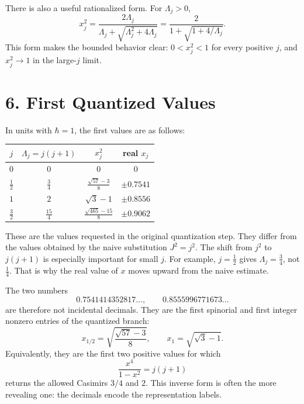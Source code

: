 \documentclass[11pt]{article}
\newcommand{\Lspin}{\Lambda_j}
\newcommand{\hb}{\hbar}
\begin{document}
There is also a useful rationalized form. For \(\Lspin>0\),
\begin{equation}
        x_j^2=
        \frac{2\Lspin}{\Lspin+\sqrt{\Lspin^2+4\Lspin}}
        =
        \frac{2}{1+\sqrt{1+4/\Lspin}} .
        \label{eq:rational}
\end{equation}
This form makes the bounded behavior clear: \(0<x_j^2<1\) for every positive \(j\), and \(x_j^2\to 1\) in the large-\(j\) limit.


\section*{6. First Quantized Values}

In units with \(\hb=1\), the first values are as follows:

\begin{center}
\begin{tabular}{c c c c}
\toprule
\(j\) & \(\Lspin=j(j+1)\) & \(x_j^2\) & real \(x_j\) \\
\midrule
\(0\) & \(0\) & \(0\) & \(0\) \\
\(\frac12\) & \(\frac34\) & \(\frac{\sqrt{57}-3}{8}\) & \(\pm 0.7541\) \\
\(1\) & \(2\) & \(\sqrt{3}-1\) & \(\pm 0.8556\) \\
\(\frac32\) & \(\frac{15}{4}\) & \(\frac{\sqrt{465}-15}{8}\) & \(\pm 0.9062\) \\
\bottomrule
\end{tabular}
\end{center}

These are the values requested in the original quantization step. They differ from the values obtained by the naive substitution \(J^2=j^2\). The shift from \(j^2\) to \(j(j+1)\) is especially important for small \(j\). For example, \(j=\frac12\) gives \(\Lspin=\frac34\), not \(\frac14\). That is why the real value of \(x\) moves upward from the naive estimate.

The two numbers
\[
        0.7541414352817\ldots,\qquad
        0.8555996771673\ldots
\]
are therefore not incidental decimals. They are the first spinorial and first integer nonzero entries of the quantized branch:
\[
        x_{1/2}=\sqrt{\frac{\sqrt{57}-3}{8}},
        \qquad
        x_1=\sqrt{\sqrt{3}-1}.
\]
Equivalently, they are the first two positive values for which
\[
        \frac{x^4}{1-x^2}=j(j+1)
\]
returns the allowed Casimirs \(3/4\) and \(2\). This inverse form is often the more revealing one: the decimals encode the representation labels.
\end{document}
